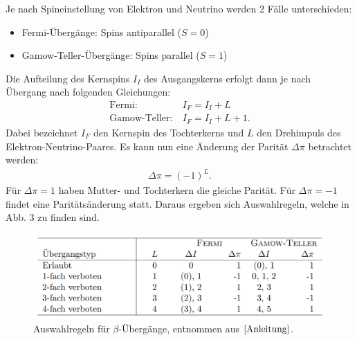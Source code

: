\documentclass[german,  %
parskip=full,  %
]{scrartcl}
\begin{document}
Je nach Spineinstellung von Elektron und Neutrino werden 2 Fälle unterschieden:
\begin{itemize}
\item Fermi-Übergänge: Spins antiparallel ($S=0$)
\item Gamow-Teller-Übergänge: Spins parallel ($S=1$)
\end{itemize}
Die Aufteilung des Kernspins $I_I$ des Ausgangskerns erfolgt dann je nach Übergang nach folgenden Gleichungen:
\begin{align*}
\text{Fermi}: & \ I_F = I_I +L \\
\text{Gamow-Teller}: & \ I_F = I_I + L + 1.
\end{align*}
Dabei bezeichnet $I_F$ den Kernspin des Tochterkerns und $L$ den Drehimpuls des Elektron-Neutrino-Paares. Es kann nun eine Änderung der Parität $\Delta \pi$ betrachtet werden:
\begin{align*}
\Delta \pi = (-1)^L.
\end{align*}
Für $\Delta \pi = 1$ haben Mutter- und Tochterkern die gleiche Parität. Für $\Delta \pi = -1$ findet eine Paritätsänderung statt. Daraus ergeben sich Auswahlregeln, welche in Abb. 3 zu finden sind.
\newpage
\begin{figure}[h!]
\centering
\includegraphics[width=\textwidth]{auswahlregeln}
\caption{Auswahlregeln für $\beta$-Übergänge, entnommen aus $\cite{Anleitung}$.}
\end{figure}
\end{document}
